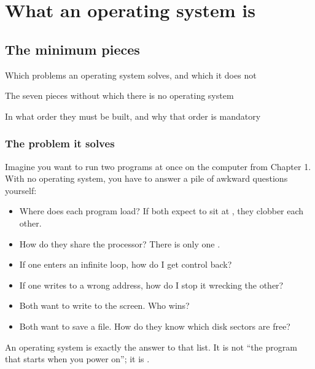 \part{What an operating system is}

\chapter{The minimum pieces}

\begin{goals}
  \item Which problems an operating system solves, and which it does not
  \item The seven pieces without which there is no operating system
  \item In what order they must be built, and why that order is mandatory
\end{goals}

\section{The problem it solves}

Imagine you want to run two programs at once on the computer from Chapter 1. With no operating
system, you have to answer a pile of awkward questions yourself:

\begin{itemize}
  \item Where does each program load? If both expect to sit at , they clobber each
        other.
  \item How do they share the processor? There is only one .
  \item If one enters an infinite loop, how do I get control back?
  \item If one writes to a wrong address, how do I stop it wrecking the other?
  \item Both want to write to the screen. Who wins?
  \item Both want to save a file. How do they know which disk sectors are free?
\end{itemize}

An operating system is exactly the answer to that list. It is not ``the program that starts when
you power on''; it is .

